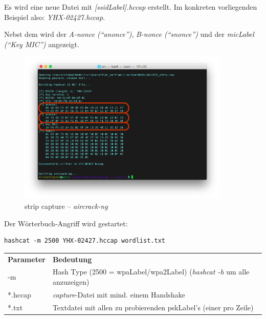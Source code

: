 Es wird eine neue Datei mit \textit{[\gls{ssidLabel}].hccap} erstellt. Im konkreten vorliegenden Beispiel also: \textit{YHX-02427.hccap}.

Nebst dem wird der \textit{A-nonce ("`anonce"')}, \textit{B-nonce ("`snonce"')} und der \textit{\gls{micLabel} ("`Key MIC"')} angezeigt.
\begin{figure}[H]
	\centering
	\includegraphics[width=0.9\textwidth]{images/wpa/conversion_cap2hccap.png}
	\caption{strip capture -- \textit{aircrack-ng}}
\end{figure}

Der Wörterbuch-Angriff wird gestartet:
\begin{lstlisting}[style=lstStyleFramed]
hashcat -m 2500 YHX-02427.hccap wordlist.txt
\end{lstlisting}
\begin{tabular}{l l}
	\textbf{Parameter} & \textbf{Bedeutung}\\
	-m & Hash Type (2500 = \gls{wpaLabel}/\gls{wpa2Label}) (\textit{hashcat -h} um alle anzuzeigen)\\
	*.hccap & \textit{capture}-Datei mit mind. einem Handshake\\
	*.txt & Textdatei mit allen zu probierenden \gls{pskLabel}'s (einer pro Zeile)\\
\end{tabular}

